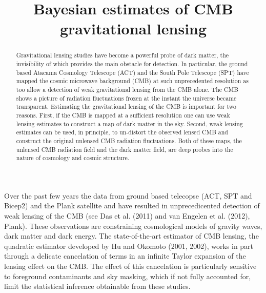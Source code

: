 \documentclass[noinfoline]{imsart}
\begin{document}
\begin{frontmatter}
\title{Bayesian estimates of CMB gravitational lensing}

\begin{abstract} 
Gravitational lensing studies have become a powerful probe of dark matter, the invisibility of which provides the main obstacle for detection. In particular, the ground based Atacama Cosmology Telescope (ACT)  and  the South Pole Telescope (SPT) have mapped the  cosmic microwave background (CMB)  at such unprecedented resolution as too allow a detection of weak gravitational lensing from the CMB alone.
The CMB shows a picture of radiation fluctuations frozen at the instant the universe became transparent. Estimating the gravitational lensing of the CMB  is important for two reasons. First, if the CMB is mapped at a sufficient resolution one can use weak lensing estimates to construct a map of dark matter in the sky.
Second,  weak lensing estimates  can be used, in principle,  to un-distort the observed lensed CMB and construct the original unlensed CMB radiation fluctuations. Both of these maps,  the unlensed CMB radiation field and the dark matter field, are deep probes into the nature of cosmology and cosmic structure. 
\end{abstract}

\begin{keyword}
\end{keyword}

\end{frontmatter}





 Over the past few years the data from ground based telecopse  (ACT, SPT and Bicep2) and  the Plank satellite and have resulted in unprecedicented detection of weak lensing of the CMB (see Das et al. (2011) and van Engelen  et al. (2012), Plank).  These observations are constraining cosmological models of gravity waves, dark matter and dark energy. The state-of-the-art estimator of CMB lensing, the quadratic estimator developed by Hu and Okomoto (2001, 2002), works in part through a delicate cancelation of terms in an infinite Taylor expansion of the lensing effect on the CMB. The effect of this cancelation is particularly sensitive to foreground contaminants and sky masking, which  if not fully accounted for,  limit  the statistical inference obtainable from these studies.  
\end{document}
